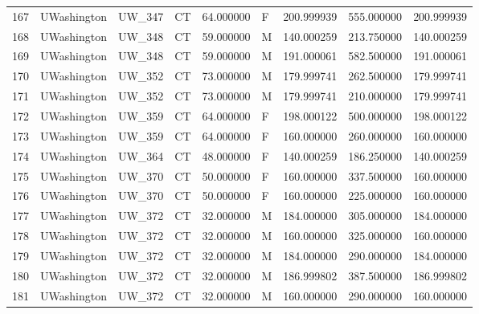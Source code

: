 \begin{tabular}{llllrlrrr}
167    &     UWashington &       UW\_347 &                 CT &  64.000000 &        F &       200.999939 &    555.000000 &  200.999939 \\
168    &     UWashington &       UW\_348 &                 CT &  59.000000 &        M &       140.000259 &    213.750000 &  140.000259 \\
169    &     UWashington &       UW\_348 &                 CT &  59.000000 &        M &       191.000061 &    582.500000 &  191.000061 \\
170    &     UWashington &       UW\_352 &                 CT &  73.000000 &        M &       179.999741 &    262.500000 &  179.999741 \\
171    &     UWashington &       UW\_352 &                 CT &  73.000000 &        M &       179.999741 &    210.000000 &  179.999741 \\
172    &     UWashington &       UW\_359 &                 CT &  64.000000 &        F &       198.000122 &    500.000000 &  198.000122 \\
173    &     UWashington &       UW\_359 &                 CT &  64.000000 &        F &       160.000000 &    260.000000 &  160.000000 \\
174    &     UWashington &       UW\_364 &                 CT &  48.000000 &        F &       140.000259 &    186.250000 &  140.000259 \\
175    &     UWashington &       UW\_370 &                 CT &  50.000000 &        F &       160.000000 &    337.500000 &  160.000000 \\
176    &     UWashington &       UW\_370 &                 CT &  50.000000 &        F &       160.000000 &    225.000000 &  160.000000 \\
177    &     UWashington &       UW\_372 &                 CT &  32.000000 &        M &       184.000000 &    305.000000 &  184.000000 \\
178    &     UWashington &       UW\_372 &                 CT &  32.000000 &        M &       160.000000 &    325.000000 &  160.000000 \\
179    &     UWashington &       UW\_372 &                 CT &  32.000000 &        M &       184.000000 &    290.000000 &  184.000000 \\
180    &     UWashington &       UW\_372 &                 CT &  32.000000 &        M &       186.999802 &    387.500000 &  186.999802 \\
181    &     UWashington &       UW\_372 &                 CT &  32.000000 &        M &       160.000000 &    290.000000 &  160.000000 \\

\end{tabular}
